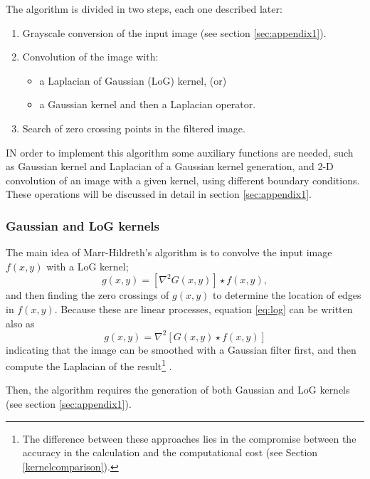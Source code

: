 \documentclass{ipol}
\numberwithin{equation}{section}
\numberwithin{table}{section}
\begin{document}
The algorithm is divided in two steps, each one described later:
\begin{enumerate}
	\item Grayscale conversion of the input image (see section \ref{sec:appendix1}).
	\item Convolution of the image with:
	\begin{itemize}
		\item a Laplacian of Gaussian (LoG) kernel, (or)
		\item a Gaussian kernel and then a Laplacian operator.
	\end{itemize}
	\item Search of zero crossing points in the filtered image.
\end{enumerate}

IN order to implement this algorithm some auxiliary functions are needed, such as Gaussian kernel and Laplacian of a Gaussian 
kernel generation, and 2-D convolution of an image with a given kernel, 
using different boundary conditions. These operations will be discussed 
in detail in section \ref{sec:appendix1}.


\subsubsection{Gaussian and LoG kernels}

The main idea of Marr-Hildreth's algorithm is to convolve the input image $f(x,y)$ with a LoG kernel;
\begin{equation}\label{eq:log}
  g(x,y) = [\nabla^2G(x,y)]\star f(x,y), 
\end{equation}
and then finding the zero crossings of $g(x,y)$ to determine the location of edges in $f(x,y)$. 
Because these are linear processes, equation \ref{eq:log} can be written also as
\begin{equation}
  g(x,y) = \nabla^2[G(x,y)\star f(x,y)]
\end{equation}
indicating that the image can be smoothed with a Gaussian filter first, and then compute the Laplacian of the result\footnote{The difference between these approaches lies in the compromise between the accuracy in the calculation and the computational cost (see Section \ref{kernelcomparison}).} .

Then, the algorithm requires the generation of both Gaussian and LoG kernels (see section \ref{sec:appendix1}).\\
\end{document}
